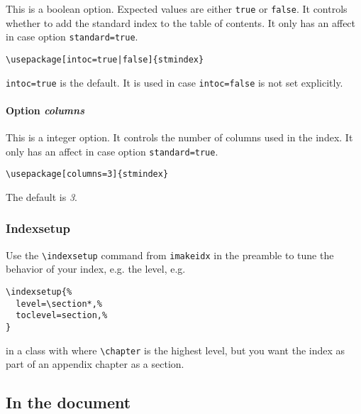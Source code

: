 \documentclass[%
  type=article,%
  layout=koma,%
  date=true,%
  hyperref=true,%
  index=false,%
  listings=true%
]{stmtext}
\begin{document}
This is a boolean option. Expected values are either \texttt{true} or \texttt{false}. It controls whether to add the standard index to the table of contents. It only has an affect in case option \texttt{standard=true}.

\begin{verbatim}
\usepackage[intoc=true|false]{stmindex}
\end{verbatim}

\texttt{intoc=true} is the default. It is used in case \texttt{intoc=false} is not set explicitly.

\paragraph{Option \protect\textit{columns}} 
\label{sec:usage:preamble:options:columns}

This is a integer option. It controls the number of columns used in the index.  It only has an affect in case option \texttt{standard=true}.

\begin{verbatim}
\usepackage[columns=3]{stmindex}
\end{verbatim}

The default is \textit{3}.

\subsubsection{Indexsetup}

Use the \verb+\indexsetup+ command from \texttt{imakeidx} in the preamble to tune the behavior of your index, e.g. the level, e.g.

\begin{verbatim}
\indexsetup{%
  level=\section*,%
  toclevel=section,%
}
\end{verbatim}

in a class with where \verb+\chapter+ is the highest level, but you want the index as part of an appendix chapter as a section.

\subsection{In the document}
\end{document}
